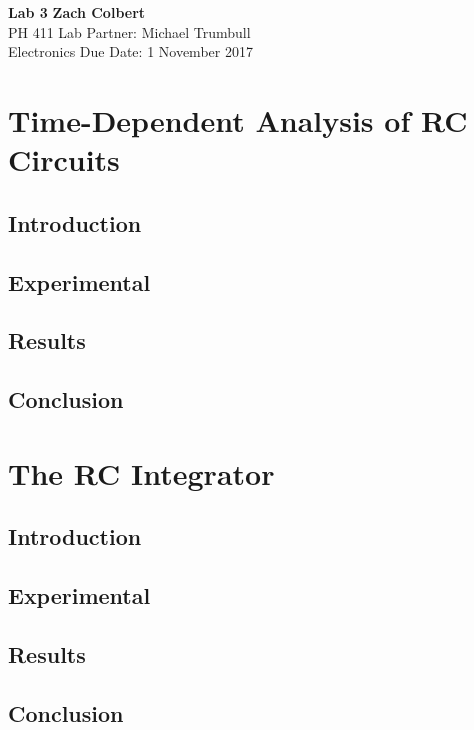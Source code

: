\documentclass[11pt]{article}
\begin{document}
\noindent
\large\textbf{Lab 3} \hfill \textbf{Zach Colbert} \\
\normalsize PH 411 \hfill Lab Partner: Michael Trumbull \\
Electronics  \hfill Due Date: 1 November 2017\\

\section{Time-Dependent Analysis of RC Circuits}
\subsection{Introduction}

\subsection{Experimental}

\subsection{Results}

\subsection{Conclusion}
    

\section{The RC Integrator}
\subsection{Introduction}

\subsection{Experimental}

\subsection{Results}

\subsection{Conclusion}
\end{document}
